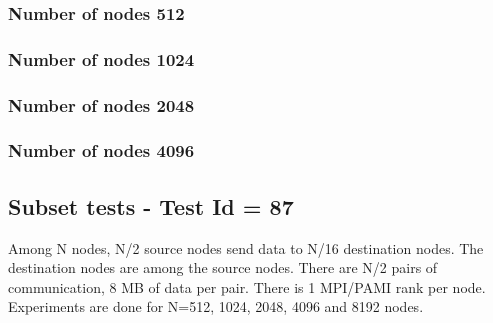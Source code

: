 \documentclass[letter]{article}
\begin{document}
\newpage

\subsubsection{Number of nodes 512}



\newpage

\subsubsection{Number of nodes 1024}



\newpage

\subsubsection{Number of nodes 2048}



\newpage

\subsubsection{Number of nodes 4096}



\newpage

\subsection{Subset tests - Test Id = 87}

Among N nodes, N/2 source nodes send data to N/16 destination nodes. The destination nodes are among the source nodes. There are N/2 pairs of communication, 8 MB of data per pair. There is 1 MPI/PAMI rank per node. Experiments are done for N=512, 1024, 2048, 4096 and 8192 nodes.
\end{document}
